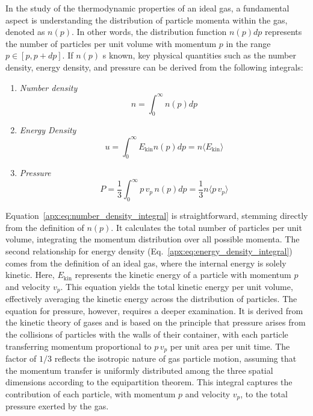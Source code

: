 \documentclass[main.tex]{subfiles}
\begin{document}
In the study of the thermodynamic properties of an ideal gas, a fundamental aspect is understanding the distribution of particle momenta within the gas, denoted as $n(p)$. In other words, the distribution function $n(p)dp$ represents the number of particles per unit volume with momentum $p$ in the range $p \in [p, p+dp]$. If $n(p)$ s known, key physical quantities such as the number density, energy density, and pressure can be derived from the following integrals:
\begin{enumerate}
    \item \textit{Number density}
        \begin{equation}\label{apx:eq:number_density_integral}
            n = \int_{0}^{\infty} n(p) dp
        \end{equation}
        
    \item \textit{Energy Density}
        \begin{equation}\label{apx:eq:energy_density_integral}
            u = \int_{0}^{\infty} E_{\text{kin}} n(p) dp = n \langle E_{\text{kin}} \rangle
        \end{equation}
        
    \item \textit{Pressure}
        \begin{equation}\label{apx:eq:pressure_integral} 
            P = \frac{1}{3}\int_{0}^{\infty} p \,v_p \,n(p) dp = \frac{1}{3} n \langle p \,v_p \rangle
        \end{equation}
\end{enumerate}
Equation~\eqref{apx:eq:number_density_integral}  is straightforward, stemming directly from the definition of $n(p)$. It calculates the total number of particles per unit volume, integrating the momentum distribution over all possible momenta.
The second relationship for energy density (Eq.~\eqref{apx:eq:energy_density_integral}) comes from the definition of an ideal gas, where the internal energy is solely kinetic. Here, $E_\mathrm{kin}$ represents the kinetic energy of a particle with momentum $p$ and velocity $v_p$. This equation yields the total kinetic energy per unit volume, effectively averaging the kinetic energy across the distribution of particles. The equation for pressure, however, requires a deeper examination. It is derived from the kinetic theory of gases and is based on the principle that pressure arises from the collisions of particles with the walls of their container, with each particle transferring momentum proportional to $p\,v_p$ per unit area per unit time. The factor of $1/3$ reflects the isotropic nature of gas particle motion, assuming that the momentum transfer is uniformly distributed among the three spatial dimensions according to the equipartition theorem. This integral captures the contribution of each particle, with momentum $p$ and velocity $v_p$, to the total pressure exerted by the gas.
\end{document}
